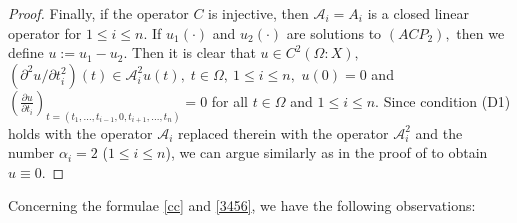\documentclass{amsart}
\theoremstyle{definition}
\theoremstyle{remark}
\numberwithin{equation}{section}
\begin{document}
\begin{proof}
Finally, if the operator $C$ is injective, then ${\mathcal A}_{i}=A_{i}$ is a closed linear operator for $1\leq i \leq n.$ If $u_{1}(\cdot)$ and $u_{2}(\cdot)$ are solutions to $(ACP_{2}),$ then we define $u:=u_{1}-u_{2}.$ Then it is clear that  $
u\in C^{2}(\Omega : X),$ $(\partial ^{2}u/\partial t_{i}^{2})(t)\in {\mathcal A}_{i}^{2}u(t),\;t \in \Omega,\ 1\leq i\leq n,$ $
u(0)=0$ and $( \frac{\partial u}{\partial t_{i}})_{t=(t_{1},...,t_{i-1},0,t_{i+1},...,t_{n})} =0$ for all $ t\in \Omega$ and $ 1\leq i\leq n.$ Since condition (D1) holds with the operator $ {\mathcal A}_{i}$ replaced therein with the operator $ {\mathcal A}_{i}^{2}$ and the number $\alpha_{i}=2$ ($1\leq i\leq n$), we can argue similarly as in the proof of \cite[Theorem 8.1.23]{apsclcs} to obtain $u\equiv 0. $ 
\end{proof}

Concerning the formulae \eqref{cc} and \eqref{3456}, we have the following observations:
\end{document}

